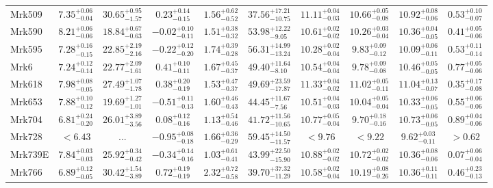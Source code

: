 \documentclass[onecolumn]{mn2e}
\begin{document}
\begin{landscape}
{\begin{center}
\begin{longtable}{lccccccccc}
Mrk509 & $7.35_{-0.04}^{+0.06}$ & $30.65_{-1.57}^{+0.95}$ & $0.23_{-0.15}^{+0.14}$ & $1.56_{-0.52}^{+0.62}$ &$37.56_{-10.75}^{+17.21}$ & $11.11_{-0.03}^{+0.04}$ & $10.66_{-0.08}^{+0.05}$ & $10.92_{-0.06}^{+0.08}$ & $0.53_{-0.07}^{+0.10}$ \\
Mrk590 & $8.21_{-0.06}^{+0.06}$ & $18.84_{-0.63}^{+0.67}$ & $-0.02_{-0.11}^{+0.10}$ & $1.51_{-0.32}^{+0.38}$ &$53.98_{-9.05}^{+12.22}$ & $10.61_{-0.02}^{+0.02}$ & $10.26_{-0.04}^{+0.03}$ & $10.36_{-0.05}^{+0.04}$ & $0.41_{-0.06}^{+0.05}$ \\
Mrk595 & $7.28_{-0.15}^{+0.16}$ & $22.85_{-2.16}^{+2.19}$ & $-0.22_{-0.20}^{+0.12}$ & $1.74_{-0.28}^{+0.39}$ &$56.31_{-13.24}^{+14.99}$ & $10.28_{-0.04}^{+0.02}$ & $9.83_{-0.12}^{+0.09}$ & $10.09_{-0.11}^{+0.06}$ & $0.53_{-0.14}^{+0.11}$ \\
Mrk6 & $7.24_{-0.14}^{+0.12}$ & $22.77_{-1.61}^{+2.09}$ & $0.41_{-0.11}^{+0.10}$ & $1.67_{-0.37}^{+0.45}$ &$49.40_{-8.10}^{+11.64}$ & $10.54_{-0.04}^{+0.04}$ & $9.78_{-0.08}^{+0.09}$ & $10.46_{-0.05}^{+0.05}$ & $0.77_{-0.06}^{+0.05}$ \\
Mrk618 & $7.98_{-0.05}^{+0.08}$ & $27.49_{-1.78}^{+1.07}$ & $0.38_{-0.19}^{+0.20}$ & $1.53_{-0.37}^{+0.47}$ &$49.69_{-17.87}^{+23.59}$ & $11.33_{-0.02}^{+0.04}$ & $11.02_{-0.11}^{+0.05}$ & $11.04_{-0.07}^{+0.13}$ & $0.35_{-0.08}^{+0.17}$ \\
Mrk653 & $7.88_{-0.12}^{+0.10}$ & $19.69_{-1.01}^{+1.27}$ & $-0.51_{-0.13}^{+0.11}$ & $1.60_{-0.43}^{+0.46}$ &$44.45_{-7.56}^{+11.67}$ & $10.51_{-0.03}^{+0.04}$ & $10.04_{-0.04}^{+0.05}$ & $10.33_{-0.05}^{+0.06}$ & $0.55_{-0.06}^{+0.06}$ \\
Mrk704 & $6.81_{-0.20}^{+0.24}$ & $26.01_{-3.56}^{+3.89}$ & $0.08_{-0.16}^{+0.12}$ & $1.13_{-0.46}^{+0.54}$ &$41.72_{-10.65}^{+11.56}$ & $10.77_{-0.04}^{+0.05}$ & $9.70_{-0.16}^{+0.18}$ & $10.73_{-0.05}^{+0.06}$ & $0.89_{-0.06}^{+0.04}$ \\
Mrk728 & $<6.43$ & ... & $-0.95_{-0.18}^{+0.08}$ & $1.66_{-0.29}^{+0.36}$ &$59.45_{-11.57}^{+14.50}$ & $<9.76$ & $<9.22$ & $9.62_{-0.11}^{+0.03}$ & $>0.62$ \\
Mrk739E & $7.84_{-0.03}^{+0.03}$ & $25.92_{-0.42}^{+0.34}$ & $-0.34_{-0.16}^{+0.14}$ & $1.03_{-0.41}^{+0.61}$ &$43.99_{-15.90}^{+22.50}$ & $10.88_{-0.02}^{+0.02}$ & $10.72_{-0.02}^{+0.02}$ & $10.36_{-0.06}^{+0.08}$ & $0.07_{-0.04}^{+0.06}$ \\
Mrk766 & $6.89_{-0.05}^{+0.12}$ & $30.42_{-3.89}^{+1.54}$ & $0.72_{-0.19}^{+0.19}$ & $2.32_{-0.58}^{+0.72}$ &$39.70_{-11.29}^{+37.32}$ & $10.58_{-0.04}^{+0.02}$ & $10.19_{-0.26}^{+0.08}$ & $10.36_{-0.11}^{+0.11}$ & $0.46_{-0.13}^{+0.23}$ \\

\end{longtable}
\end{center}}
\end{landscape}
\end{document}

